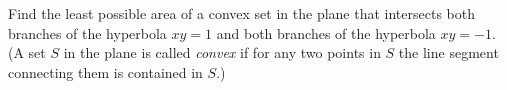 Find the least possible area of a convex set in the plane that
intersects both branches of the hyperbola $xy = 1$ and both branches of
the hyperbola $xy = -1$. (A set $S$ in the plane is called \emph{convex}
if for any two points in $S$ the line segment connecting them is
contained in $S$.)
